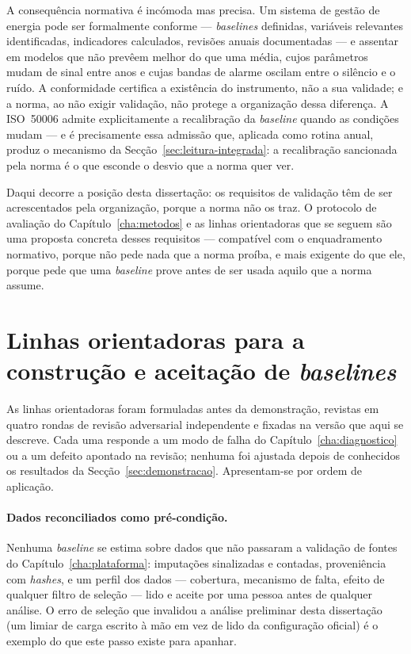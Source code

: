A consequência normativa é incómoda mas precisa. Um sistema de gestão de
energia pode ser formalmente conforme --- \emph{baselines} definidas,
variáveis relevantes identificadas, indicadores calculados, revisões
anuais documentadas --- e assentar em modelos que não prevêem melhor do que
uma média, cujos parâmetros mudam de sinal entre anos e cujas bandas de
alarme oscilam entre o silêncio e o ruído. A conformidade certifica a
existência do instrumento, não a sua validade; e a norma, ao não exigir
validação, não protege a organização dessa diferença. A ISO~50006 admite
explicitamente a recalibração da \emph{baseline} quando as condições mudam
--- e é precisamente essa admissão que, aplicada como rotina anual, produz o
mecanismo da Secção~\ref{sec:leitura-integrada}: a recalibração sancionada
pela norma é o que esconde o desvio que a norma quer ver.

Daqui decorre a posição desta dissertação: os requisitos de validação têm
de ser acrescentados pela organização, porque a norma não os traz. O
protocolo de avaliação do Capítulo~\ref{cha:metodos} e as linhas
orientadoras que se seguem são uma proposta concreta desses requisitos ---
compatível com o enquadramento normativo, porque não pede nada que a norma
proíba, e mais exigente do que ele, porque pede que uma \emph{baseline} prove
antes de ser usada aquilo que a norma assume.

\section{Linhas orientadoras para a construção e aceitação de \emph{baselines}}
\label{sec:guidelines}

As linhas orientadoras foram formuladas antes da demonstração, revistas em
quatro rondas de revisão adversarial independente
e fixadas na versão que aqui se descreve. Cada uma responde a um modo de
falha do Capítulo~\ref{cha:diagnostico} ou a um defeito apontado na revisão;
nenhuma foi ajustada depois de conhecidos os resultados da
Secção~\ref{sec:demonstracao}. Apresentam-se por ordem de aplicação.

\paragraph{Dados reconciliados como pré-condição.} Nenhuma \emph{baseline} se
estima sobre dados que não passaram a validação de fontes do
Capítulo~\ref{cha:plataforma}: imputações sinalizadas e contadas,
proveniência com \emph{hashes}, e um perfil dos dados --- cobertura,
mecanismo de falta, efeito de qualquer filtro de seleção --- lido e aceite
por uma pessoa antes de qualquer análise. O erro de seleção que invalidou a
análise preliminar desta dissertação (um limiar de carga escrito à mão em vez
de lido da configuração oficial) é o exemplo do que este passo existe para
apanhar.

